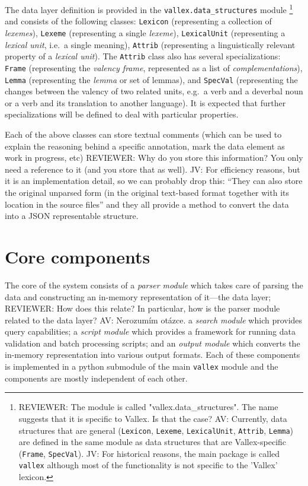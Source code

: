 \documentclass[10pt, a4paper]{article}
\newcommand{\py}[1]{{\tt #1}}
\newcommand{\av}[1]{{\color{ansa} AV: #1}}
\newcommand{\jv}[1]{{\color{svlinks} JV: #1}}
\newcommand{\rrr}[1]{{\color{red} REVIEWER: #1}}
\begin{document}
The data layer definition is provided in the \py{vallex.data\_structures} module%
\footnote{%
\rrr{The module is called "vallex.data\_structures". The name suggests that it is specific to Vallex. Is that the case?
} 
\av{Currently, data structures that are general
(\py{Lexicon}, \py{Lexeme}, \py{LexicalUnit}, \py{Attrib}, \py{Lemma})
are defined in the same module as data structures that are Vallex-specific
(\py{Frame}, \py{SpecVal}).
}
\jv{For historical reasons, the main package is called \py{vallex} although most of the functionality
is not specific to the 'Vallex' lexicon.}
}
and consists of the
following classes:
\py{Lexicon} (representing a collection of \emph{lexemes}), \py{Lexeme} (representing
a single \emph{lexeme}), \py{LexicalUnit} (representing a \emph{lexical unit}, i.e.\ a single meaning), \py{Attrib} (representing a linguistically relevant property of a \emph{lexical unit}). The \py{Attrib} class also has several specializations:
\py{Frame} (representing the \emph{valency frame}, represented as a list of \emph{complementations}),
\py{Lemma} (representing the \emph{lemma} or set of lemmas), and
\py{SpecVal} (representing the changes between the valency of two related units,
e.g.\ a verb and a deverbal noun or a verb and its translation to another language).
It is expected that further specializations
will be defined to deal with particular properties.

Each of the above classes can store textual comments (which can be used to explain
the reasoning behind a specific annotation, mark the data element as work in progress, etc)
\rrr{Why do you store this information? You only need a reference to it (and you store that as well).}
\jv{For efficiency reasons, but it is an implementation detail, so we can probably drop this: ``They can also
store the original unparsed form (in the original text-based format
together with its location in the source files''}
and they all provide a method to convert the data into a JSON representable structure.

\section{Core components}
The core of the system consists of a \emph{parser module} which takes care of parsing the data and
constructing an in-memory representation of it---the data layer; 
\rrr{How does this relate? In particular, how is the parser module related to the data layer?}
\av{Nerozumím otázce.}
a \emph{search module} which
provides query capabilities; a \emph{script module} which provides a framework for running data validation
and batch processing scripts; and an \emph{output module} which converts the in-memory representation into
various output formats. Each of these components is implemented in a python submodule of the main \py{vallex}
module and the components are mostly independent of each other.
\end{document}
